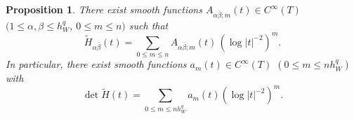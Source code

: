 \documentclass[amscd, leqno]{amsart}
\theoremstyle{plain}
\newtheorem{proposition}[theorem]{Proposition}
\theoremstyle{definition}
\theoremstyle{remark}
\begin{document}
\begin{proposition}
\label{prop:asym:ex}
There exist smooth functions $A_{\alpha\bar{\beta};m}(t) \in C^{\infty}(T)$ $(1\leq\alpha,\beta\leq h_{W}^{q}$, $0\leq m\leq n)$ such that
\begin{equation}
\label{eqn:asym:exp:H}
\widetilde{H}_{\alpha\bar{\beta}}(t) = \sum_{0 \leq m \leq n} A_{\alpha\bar{\beta};m}(t)\,(\log|t|^{-2})^{m}.
\end{equation}
In particular, there exist smooth functions $a_{m}(t) \in C^{\infty}(T)$ $( 0\leq m\leq n h_{W}^{q} )$ with
\begin{equation}
\label{eqn:asym:exp:det:H}
\det \widetilde{H}(t) = \sum_{0 \leq m \leq n h_{W}^{q}} a_{m}(t) (\log|t|^{-2})^{m}.
\end{equation}
\end{proposition}
\end{document}
